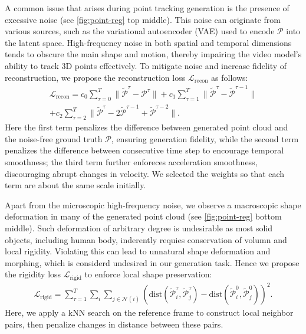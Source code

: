 A common issue that arises during point tracking generation is the presence of excessive noise (see \autoref{fig:point-reg} top middle). This noise can originate from various sources, such as the variational autoencoder (VAE) used to encode $\mathcal P$ into the latent space. High-frequency noise in both spatial and temporal dimensions tends to obscure the main shape and motion, thereby impairing the video model's ability to track 3D points effectively. To mitigate noise and increase fidelity of reconstruction, we propose the reconstruction loss $\mathcal{L}_{\text{recon}}$ as follows:
\begin{multline}
    \mathcal{L}_{\text{recon}} = c_0\sum_{\tau=0}^T\|\tilde{\mathcal P}^\tau - \mathcal P^\tau\| + c_1 \sum_{\tau=1}^T \|\tilde{\mathcal P}^\tau - \tilde{\mathcal P}^{\tau-1}\| \\ + c_2 \sum_{\tau=2}^T \|\tilde{\mathcal P}^\tau - 2\tilde{\mathcal P}^{\tau-1} + \tilde{\mathcal P}^{\tau-2}\|.
\end{multline}
Here the first term penalizes the difference between generated point cloud and the noise-free ground truth $\mathcal P$, ensuring generation fidelity, while the second term penalizes the difference between consecutive time step to encourage temporal smoothness; the third term further enforeces acceleration smoothness, discouraging abrupt changes in velocity. We selected the weights so that each term are about the same scale initially. 

Apart from the microscopic high-frequency noise, we observe a macroscopic shape deformation in many of the generated point cloud (see \autoref{fig:point-reg} bottom middle). Such deformation of arbitrary degree is undesirable as most solid objects, including human body, inderently requies conservation of volumn and local rigidity. Violating this can lead to unnatural shape deformation and morphing, which is considerd undesired in our generation task. Hence we propose the rigidity loss $\mathcal{L}_{\text{rigid}}$ to enforce local shape preservation:
\begin{align}
    \mathcal{L}_{\text{rigid}} = \sum_{\tau=1}^T \sum_{i} \sum_{j \in \mathcal{N}(i)} \left(\text{dist}(\tilde{\mathcal P}_i^\tau, \tilde{\mathcal P}_j^\tau)-\text{dist}(\tilde{\mathcal P}_i^0, \tilde{\mathcal P}_j^0)\right)^2.
\end{align}
Here, we apply a kNN search on the reference frame to construct local neighbor pairs, then penalize changes in distance between these pairs.

